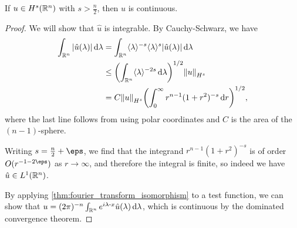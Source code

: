 \begin{lemma}
	If $u \in H^s(\mathbb R^n)$ with $s > \frac n2$, then  $u$ is continuous. 
\end{lemma}

\begin{proof}
	We will show that $\hat u$ is integrable. By Cauchy-Schwarz, we have
	\begin{align*}
		\int_{\mathbb R^n} \abs{\hat u(\lambda)} \dd{\lambda} &= \int_{\mathbb R^n}  \langle\lambda\rangle^{-s} \langle\lambda\rangle^s \abs{\hat u(\lambda)} \dd{\lambda} \\
		&\leq \qty(\int_{\mathbb R^n}  \langle\lambda\rangle^{-2s}\dd{\lambda})^{1/2} \norm{u}_{H^s} \\
		&= C \norm{u}_{H^s} \qty(\int_0^\infty r^{n-1} (1 + r^2)^{-s} \dd{r})^{1/2}, 
	\end{align*}
where the last line follows from using polar coordinates and $C$ is the area of the $(n-1)$-sphere. 

Writing $s = \frac n2 + \eps$, we find that the integrand $r^{n-1}(1 + r^2)^{-s}$ is of order $O(r^{-1 - 2\eps})$ as $r \to\infty$, and therefore the integral is finite, so indeed we have $\hat u \in L^1(\mathbb R^n)$. 

By applying \cref{thm:fourier_transform_isomorphism} to a test function, we can show that $u = (2\pi)^{-n} \int_{\RR^n} e^{i\lambda \vd x} \hat u(\lambda) \dd{\lambda}$, which is continuous by the dominated convergence theorem. 
\end{proof}
